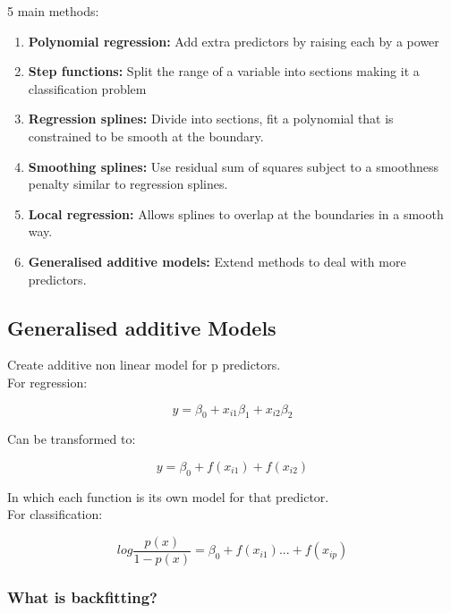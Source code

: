 \documentclass[11pt]{scrartcl} %
\begin{document}
5 main methods:

\begin{enumerate}
	\item \textbf{Polynomial regression:} Add extra predictors by raising each by a power
	\item \textbf{Step functions:} Split the range of a variable into sections making it a classification problem
	\item \textbf{Regression splines:} Divide into sections, fit a polynomial that is constrained to be smooth
	at the boundary.
	\item \textbf{Smoothing splines:} Use residual sum of squares subject to a smoothness penalty similar to regression splines.
	\item \textbf{Local regression:} Allows splines to overlap at the boundaries in a smooth way.
	\item \textbf{Generalised additive models:} Extend methods to deal with more predictors.
\end{enumerate}

\subsection{Generalised additive Models}

Create additive non linear model for p predictors.\\

For regression:

\begin{equation}
	y = \beta_0 + x_{i1}\beta_1 + x_{i2}\beta_2
\end{equation}

Can be transformed to:

\begin{equation}
	y = \beta_0 + f(x_{i1}) + f(x_{i2})
\end{equation}

In which each function is its own model for that predictor.\\

For classification:

\begin{equation}
	log\frac{p(x)}{1-p(x)} = \beta_0 + f(x_{i1}) ... + f(x_{ip})
\end{equation}

\subsubsection{What is backfitting?}
\end{document}
